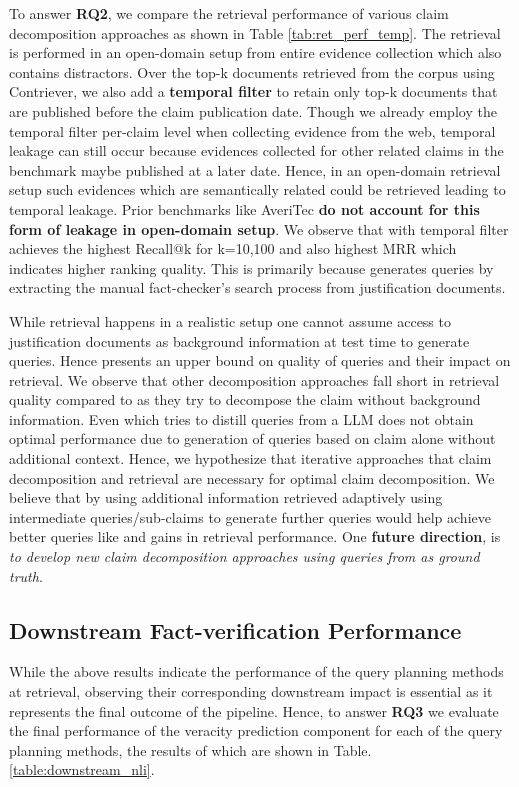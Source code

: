 To answer \textbf{RQ2}, we compare the retrieval performance of various claim decomposition approaches as shown in Table \ref{tab:ret_perf_temp}.  The retrieval is performed in an open-domain setup from entire evidence collection which also contains distractors. Over the top-k documents retrieved from the corpus using Contriever, we also add a \textbf{temporal filter} to retain only top-k documents that are published before the claim publication date. Though we already employ the temporal filter per-claim level when collecting evidence from the web, temporal leakage can still occur because evidences collected for other related claims in the benchmark maybe published at a later date. Hence, in an open-domain retrieval setup such evidences which are semantically related could be retrieved leading to temporal leakage. Prior benchmarks like AveriTec \cite{averitec} \textbf{do not account for this form of leakage in open-domain setup}. We observe that \name{} with temporal filter achieves the highest Recall@k for k=10,100 and also highest MRR which indicates higher ranking quality. This is primarily because \name{} generates queries by extracting the manual fact-checker's search process from justification documents.

While retrieval happens in a realistic setup one cannot assume access to justification documents as background information at test time to generate queries. Hence \name{} presents an upper bound on quality of queries and their impact on retrieval.  We observe that other decomposition approaches fall short in retrieval quality compared to \name{} as they try to decompose the claim without background information. Even \qgen{} which tries to distill \name{} queries from a LLM does not obtain optimal performance due to generation of queries based on claim alone without additional context. Hence, we hypothesize that iterative approaches that  claim decomposition and retrieval are necessary for optimal claim decomposition. We believe that by using additional information retrieved adaptively using intermediate queries/sub-claims to generate further queries  would help achieve better queries like \name{} and gains in retrieval performance. One \textbf{future direction}, is \emph{to develop new claim decomposition approaches  using queries from \name{} as ground truth}.

\vspace{-1em}

\subsection{Downstream Fact-verification Performance}
\label{5.3}
While the above results indicate the performance of the query planning methods at retrieval, observing their corresponding downstream impact is essential as it represents the final outcome of the pipeline. Hence, to answer \textbf{RQ3} we evaluate the final performance of the veracity prediction component for each of the query planning methods, the results of which are shown in Table.\ref{table:downstream_nli}. 



